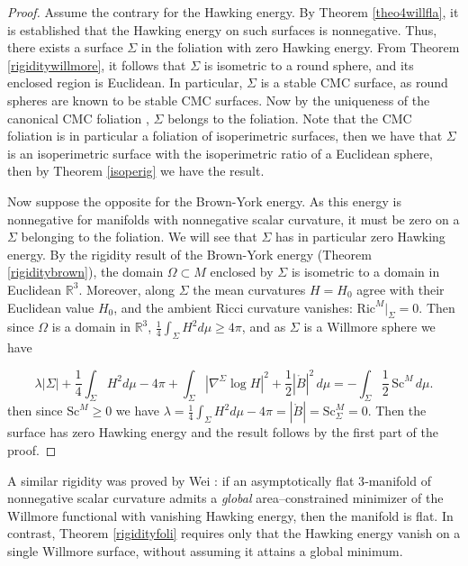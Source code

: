 \documentclass[12pt,a4paper]{amsart}
\theoremstyle{plain}
\theoremstyle{definition}
\begin{document}
\begin{proof}
    Assume the contrary for the Hawking energy. By Theorem \ref{theo4willfla}, it is established that the Hawking energy on such surfaces is nonnegative. Thus, there exists a surface $\Sigma$ in the foliation with zero Hawking energy. From Theorem \ref{rigiditywillmore}, it follows that $\Sigma$ is isometric to a round sphere, and its enclosed region is Euclidean. In particular, $\Sigma$ is a stable CMC surface, as round spheres are known to be stable CMC surfaces.  Now by the uniqueness of the canonical CMC foliation \cite{Nerz2}, $\Sigma $ belongs to the foliation. Note that the CMC foliation is in particular a foliation of isoperimetric surfaces, then we have that $\Sigma$ is an isoperimetric surface with the isoperimetric ratio of a Euclidean sphere, then by Theorem \ref{isoperig} we have the result. 

    Now suppose the opposite for the Brown-York energy. As this energy is nonnegative for manifolds with nonnegative scalar curvature, it must be zero on a $\Sigma$ belonging to the foliation. We will see that $\Sigma$ has in particular zero Hawking energy.   By the rigidity result of the Brown-York energy (Theorem \ref{rigiditybrown}),   the domain $\Omega \subset M$ enclosed by $\Sigma$ is isometric to a domain in Euclidean \(\mathbb{R}^3\).  Moreover, along \(\Sigma\) the mean curvatures \(
H = H_0\)
agree with their Euclidean value \(H_0\), and the ambient Ricci curvature vanishes:
\(
\mathrm{Ric}^M\bigl|_{\Sigma} = 0.
\)  Then since $\Omega$ is a domain in $\mathbb{R}^3$, $\frac{1}{4} \int_{\Sigma} H^2 d\mu \geq 4 \pi$, and as $\Sigma$ is a Willmore sphere  we have 
    
    \[
\lambda |\Sigma | + \frac{1}{4} \int_{\Sigma} H^2d\mu-4\pi +\int_{\Sigma} |\nabla^{\Sigma}  \log H|^2  + \frac{1}{2} |\mathring{B}|^2  \, d\mu =  - \int_{\Sigma } \frac{1}{2} \, \mathrm{Sc}^M \, d\mu.
\]   
then since $\mathrm{Sc}^M \geq 0$ we have $\lambda= \frac{1}{4} \int_{\Sigma} H^2 d\mu-4\pi=|\mathring{B}|=\mathrm{Sc}^M_{\Sigma} =0$. Then the surface has zero Hawking energy and the result follows by the first part of the proof.  
\end{proof}
A similar rigidity was proved by Wei \cite[Theorem 1.2]{wei2021minimizers}: if an asymptotically flat 3‐manifold of nonnegative scalar curvature admits a {\em global} area–constrained minimizer of the Willmore functional  with vanishing Hawking energy, then the manifold is flat.  In contrast, Theorem \ref{rigidityfoli} requires only that the Hawking energy vanish on a single Willmore surface, without assuming it attains a global minimum.
\end{document}
